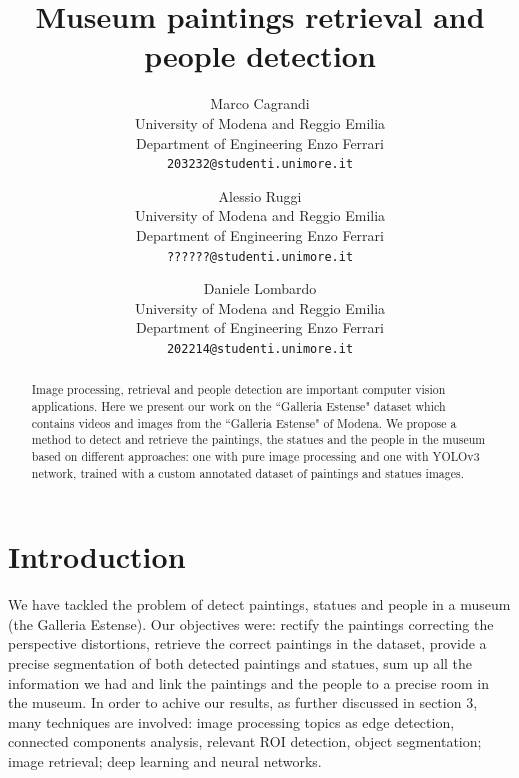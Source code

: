\documentclass[10pt,twocolumn,letterpaper]{article}
\begin{document}
\title{Museum paintings retrieval and people detection}

\author{Marco Cagrandi\\
University of Modena and Reggio Emilia\\
Department of Engineering Enzo Ferrari\\
{\tt\small 203232@studenti.unimore.it}
\and
Alessio Ruggi\\
University of Modena and Reggio Emilia\\
Department of Engineering Enzo Ferrari\\
{\tt\small ??????@studenti.unimore.it}
\and
Daniele Lombardo\\
University of Modena and Reggio Emilia\\
Department of Engineering Enzo Ferrari\\
{\tt\small 202214@studenti.unimore.it}
}


\maketitle

\begin{abstract}
   Image processing, retrieval and people detection
   are important computer vision applications.
   Here we present our work on the ``Galleria Estense" dataset which contains
   videos and images from the ``Galleria Estense" of Modena.
   We propose a method to detect and retrieve the paintings, the statues and the people in the 
   museum based on different approaches: one with pure image processing and one 
   with YOLOv3 network, trained with a custom annotated dataset of paintings and statues 
   images. 
\end{abstract}

\section{Introduction}

We have tackled the problem of detect paintings, statues and people in a museum (the Galleria Estense).
Our objectives were: rectify the paintings correcting the perspective distortions, retrieve the correct paintings in the dataset, provide a precise segmentation of both detected paintings and statues, sum up all the information we had and link the paintings and the people to a precise room in the museum.
 In order to achive our results, as further discussed in section 3, many techniques are involved: image processing topics as edge detection, connected components analysis, relevant ROI detection, object segmentation; image retrieval; deep learning and neural networks. 
\end{document}

